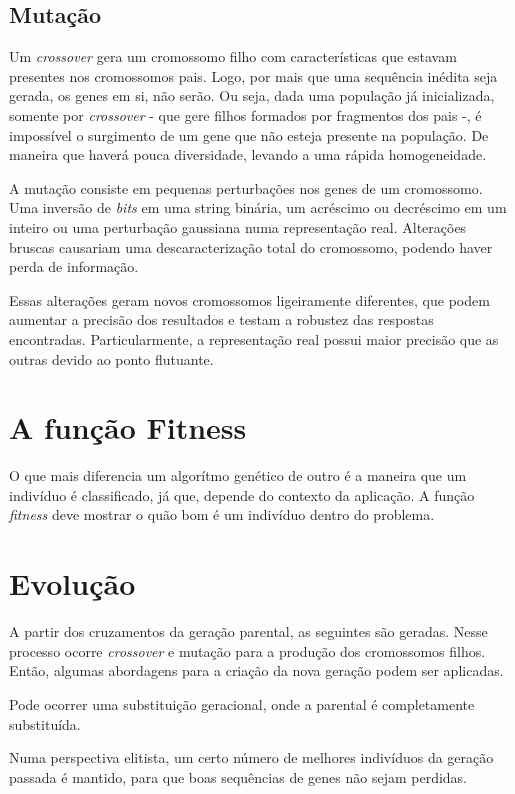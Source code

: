 \subsection{Mutação}
Um {\it crossover} gera um cromossomo filho com características que estavam
presentes nos cromossomos pais. Logo, por mais que uma sequência inédita seja 
gerada, os genes em si, não serão. Ou seja, dada uma população já inicializada,
somente por {\it crossover} - que gere filhos formados por fragmentos dos pais -, 
é impossível o surgimento de um gene que não esteja presente na população.
De maneira que haverá pouca diversidade, levando a uma rápida homogeneidade.

A mutação consiste em pequenas perturbações nos genes de um cromossomo. Uma 
inversão de {\it bits} em uma string binária, um acréscimo ou decréscimo em 
um inteiro ou uma perturbação gaussiana numa representação real. Alterações
bruscas causariam uma descaracterização total do cromossomo, podendo haver 
perda de informação. 

Essas alterações geram novos cromossomos ligeiramente diferentes, que podem
aumentar a precisão dos resultados e testam a robustez das respostas 
encontradas. Particularmente, a representação real possui maior precisão 
que as outras devido ao ponto flutuante.

\section{A função Fitness}
O que mais diferencia um algorítmo genético de outro é a maneira que um indivíduo
é classificado, já que, depende do contexto da aplicação.
A função {\it fitness} deve mostrar o quão bom é um indivíduo dentro do problema.

\section{Evolução}
A partir dos cruzamentos da geração parental, as seguintes são geradas. Nesse processo
ocorre {\it crossover} e mutação para a produção dos cromossomos filhos. Então, algumas abordagens 
para a criação da nova geração podem ser aplicadas.

Pode ocorrer uma substituição geracional, onde a parental é completamente substituída. 

Numa perspectiva elitista, um certo número de melhores indivíduos da geração passada
é mantido, para que boas sequências de genes não sejam perdidas.

